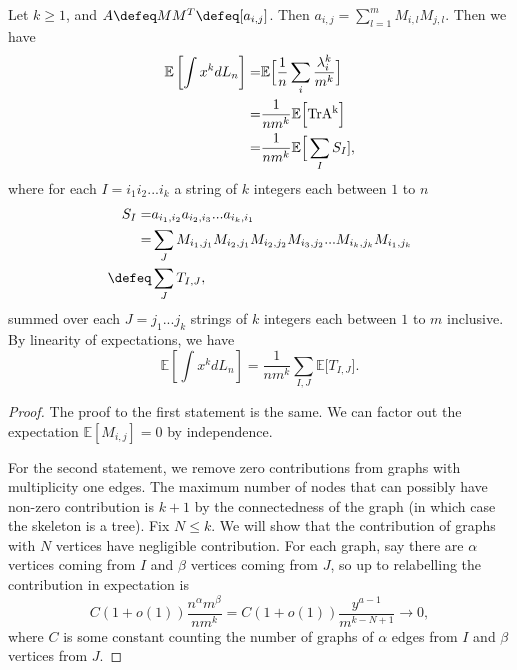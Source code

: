 Let $k\geq 1$, and $A\defeq MM^T\defeq[a_{i,j}]$.
Then $a_{i,j}=\sum_{l=1}^m M_{i,l}M_{j,l}$.
Then we have \begin{align*}
    \mathbb{E}\left[\int x^k dL_n\right]=&\mathbb{E}\Big[\frac{1}{n} \sum_{i}\frac{\lambda_i^k}{m^k}\Big]\\
    =& \frac{1}{nm^k}\mathbb{E}\Big[\rm{Tr}A^k\Big]\\
    =& \frac{1}{nm^k}\mathbb{E}\Big[\sum_{I}S_I],
\end{align*}
where for each $I=i_1i_2...i_k$ a string of $k$ integers each between $1$ to $n$ \begin{align*}  
S_I=& a_{i_1,i_2}a_{i_2,i_3}...a_{i_k,i_1}\\
=&\sum_{J} M_{i_1,j_1}M_{i_2,j_1}M_{i_2,j_2}M_{i_3,j_2}... M_{i_k,j_k}M_{i_1,j_k}\\
\defeq & \sum_J T_{I,J},
\end{align*}
summed over each $J=j_1...j_k$ strings of $k$ integers each between $1$ to $m$ inclusive. 
By linearity of expectations, we have \[
    \mathbb{E}\left[\int x^k dL_n\right]
    =\frac{1}{nm^k}\sum_{I,J}\mathbb{E}\Big[T_{I,J}\Big].
\]
\begin{proof}
    The proof to the first statement is the same. We can factor out the expectation $\mathbb{E}[M_{i,j}]=0$ by independence.

    For the second statement, we remove zero contributions from graphs with multiplicity one edges. The maximum number of nodes that can possibly have non-zero contribution is $k+1$ by the connectedness of the graph (in which case the skeleton is a tree). Fix $N\leq k$. We will show that the contribution of graphs with $N$ vertices have negligible contribution. For each graph, say there are $\alpha$ vertices coming from $I$ and $\beta$ vertices coming from $J$, so up to relabelling the contribution in expectation is \[
        C(1+o(1))\frac{n^\alpha m^\beta}{nm^k} = C(1+o(1))\frac{y^{a-1}}{m^{k-N+1}}\to 0,
    \]
    where $C$ is some constant counting the number of graphs of $\alpha$ edges from $I$ and $\beta$ vertices from $J$.
\end{proof}

